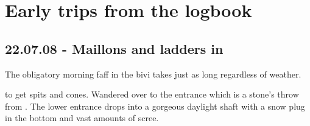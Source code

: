 \section{Early trips from the logbook}

\subsection{22.07.08 - Maillons and ladders in \protect{}}


\begin{marginfigure}
\checkoddpage \ifoddpage \forcerectofloat \else \forceversofloat \fi
\centering
 \caption{The obligatory morning faff in the bivi takes just as long regardless of weather. }
 \label{sunny morning bivi}
\end{marginfigure}


 to get spits and cones.
Wandered over to the entrance which is a stone's throw from .
The lower entrance drops into a gorgeous daylight shaft with a snow plug
in the bottom and vast amounts of scree.

